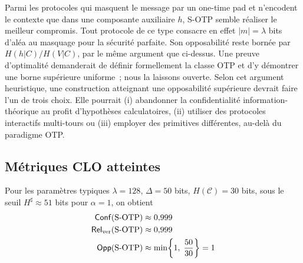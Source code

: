 \begin{sloppypar}
\begin{remark}\label{thm:optimalite_sotp}
Parmi les protocoles qui masquent le message par un one-time pad et
n'encodent le contexte que dans une composante auxiliaire $h$, S-OTP
semble r\'ealiser le meilleur compromis. Tout protocole de ce type
consacre en effet $|m| = \lambda$ bits d'al\'ea au masquage pour la s\'ecurit\'e
parfaite. Son opposabilit\'e reste born\'ee par $H(h|C)/H(V|C)$, par le m\^eme argument
que ci-dessus. Une preuve d'optimalit\'e demanderait de d\'efinir
formellement la classe OTP et d'y d\'emontrer une borne sup\'erieure
uniforme~; nous la laissons ouverte. Selon cet argument heuristique, une
construction atteignant une opposabilit\'e sup\'erieure devrait faire l'un de trois choix. Elle pourrait (i) abandonner la confidentialit\'e
information-th\'eorique au profit d'hypoth\`eses calculatoires, (ii) utiliser
des protocoles interactifs multi-tours ou (iii) employer des primitives
diff\'erentes, au-del\`a du paradigme OTP.
\end{remark}

\subsection{M\'etriques CLO atteintes}
\label{subsec:metriques_sotp}

Pour les param\`etres typiques $\lambda = 128$, $\Delta = 50$ bits,
$H(\mathcal{C}) = 30$ bits, sous le seuil $H^\sharp \approx 51$ bits pour $\alpha = 1$, on obtient
\begin{align}
\mathsf{Conf}(\text{S-OTP}) &\approx 0{,}999 \label{eq:sotp_conf_numerique} \\
\mathsf{Rel}_{\mathrm{ver}}(\text{S-OTP}) &\approx 0{,}999 \label{eq:sotp_rel_numerique} \\
\mathsf{Opp}(\text{S-OTP}) &\approx \min\!\left\{1,\; \frac{50}{30}\right\} = 1 \label{eq:sotp_opp_numerique}
\end{align}


\end{sloppypar}
